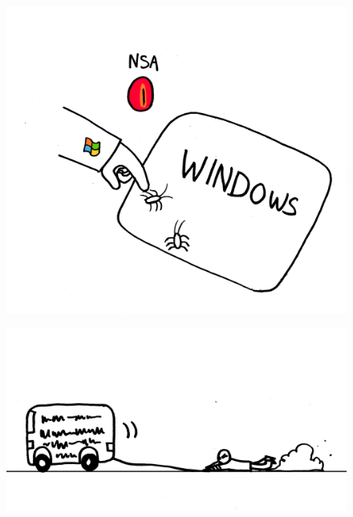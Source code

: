 \documentclass[notes,usenames,dvipsnames]{beamer}       %
\begin{document}
\begin{frame}
  \begin{figure}
    \centering
    \includegraphics[scale=0.6]{img/pr-tell-nsa}
  \end{figure}
\end{frame}

\begin{frame}
  \begin{figure}
    \centering
    \includegraphics[scale=0.4]{img/pr-injury}
  \end{figure}
\end{frame}
\end{document}
